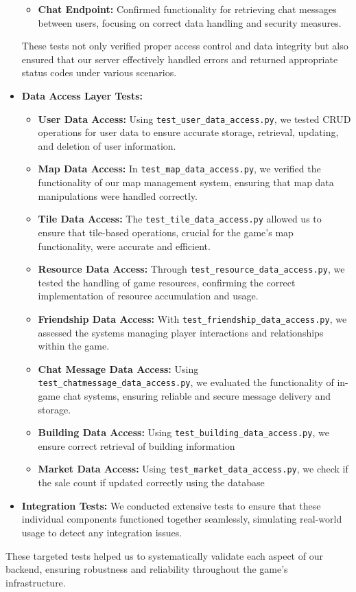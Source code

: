 \documentclass[12pt]{article}
\begin{document}
\begin{itemize}
\begin{itemize}
            \item \textbf{Chat Endpoint:} Confirmed functionality for retrieving chat messages between users, focusing on correct data handling and security measures.
        \end{itemize}
    These tests not only verified proper access control and data integrity but also ensured that our server effectively handled errors and returned appropriate status codes under various scenarios.
    \item \textbf{Data Access Layer Tests:}
    \begin{itemize}
        \item \textbf{User Data Access:} Using \texttt{test\_user\_data\_access.py}, we tested CRUD operations for user data to ensure accurate storage, retrieval, updating, and deletion of user information.
        \item \textbf{Map Data Access:} In \texttt{test\_map\_data\_access.py}, we verified the functionality of our map management system, ensuring that map data manipulations were handled correctly.
        \item \textbf{Tile Data Access:} The \texttt{test\_tile\_data\_access.py} allowed us to ensure that tile-based operations, crucial for the game's map functionality, were accurate and efficient.
        \item \textbf{Resource Data Access:} Through \texttt{test\_resource\_data\_access.py}, we tested the handling of game resources, confirming the correct implementation of resource accumulation and usage.
        \item \textbf{Friendship Data Access:} With \texttt{test\_friendship\_data\_access.py}, we assessed the systems managing player interactions and relationships within the game.
        \item \textbf{Chat Message Data Access:} Using \texttt{test\_chatmessage\_data\_access.py}, we evaluated the functionality of in-game chat systems, ensuring reliable and secure message delivery and storage.
        \item \textbf{Building Data Access:} Using \texttt{test\_building\_data\_access.py}, we ensure correct retrieval of building information
        \item \textbf{Market Data Access:} Using \texttt{test\_market\_data\_access.py}, we check if the sale count if updated correctly using the database
    \end{itemize}
    \item \textbf{Integration Tests:} We conducted extensive tests to ensure that these individual components functioned together seamlessly, simulating real-world usage to detect any integration issues.
\end{itemize}
These targeted tests helped us to systematically validate each aspect of our backend, ensuring robustness and reliability throughout the game's infrastructure.
\end{document}
